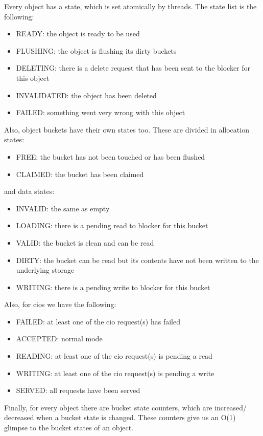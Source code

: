 Every object has a state, which is set atomically by threads. The state list is
the following:

\begin{itemize}
	\item READY: the object is ready to be used
	\item FLUSHING: the object is flushing its dirty buckets
	\item DELETING: there is a delete request that has been sent to the 
		blocker for this object
	\item INVALIDATED: the object has been deleted
	\item FAILED: something went very wrong with this object
\end{itemize}

Also, object buckets have their own states too. These are divided in allocation 
states:

\begin{itemize}
	\item FREE: the bucket has not been touched or has been flushed
	\item CLAIMED: the bucket has been claimed
\end{itemize}

and data states:

\begin{itemize}
	\item INVALID: the same as empty
	\item LOADING: there is a pending read to blocker for this bucket
	\item VALID: the bucket is clean and can be read
	\item DIRTY: the bucket can be read but its contents have not been
		written to the underlying storage
	\item WRITING: there is a pending write to blocker for this bucket
\end{itemize}

Also, for cios we have the following:

\begin{itemize}
	\item FAILED: at least one of the cio request(s) has failed
	\item ACCEPTED: normal mode
	\item READING: at least one of the cio request(s) is pending a read
	\item WRITING: at least one of the cio request(s) is pending a write
	\item SERVED: all requests have been served
\end{itemize}


Finally, for every object there are bucket state counters, which are increased/
decreased when a bucket state is changed. These counters give us an O(1)
glimpse to the bucket states of an object.


